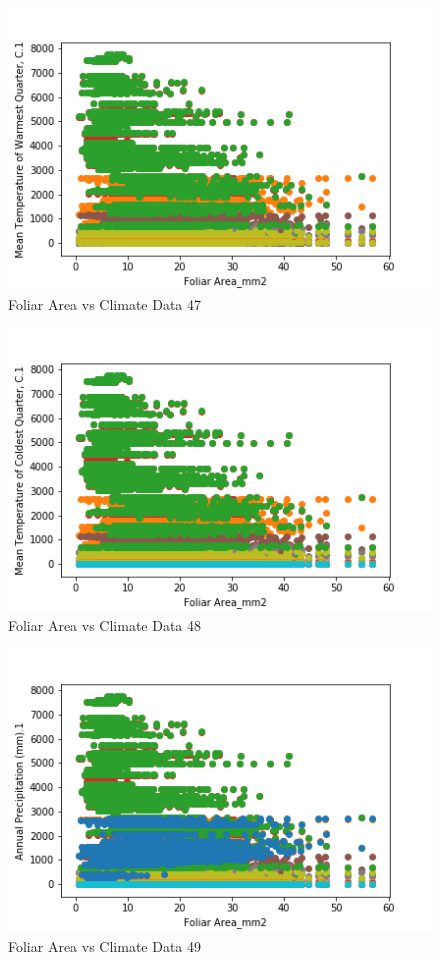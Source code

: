 \documentclass[letterpaper]{article}
\begin{document}
\begin{figure}[h]
\caption{Foliar Area vs Climate Data 47\label{fig:Foliar_Area_vs_47}}
\centering
\includegraphics[width=0.7\paperwidth]{Foliar_Area_vs_47}
\end{figure}


\begin{figure}[h]
\caption{Foliar Area vs Climate Data 48\label{fig:Foliar_Area_vs_48}}
\centering
\includegraphics[width=0.7\paperwidth]{Foliar_Area_vs_48}
\end{figure}


\begin{figure}[h]
\caption{Foliar Area vs Climate Data 49\label{fig:Foliar_Area_vs_49}}
\centering
\includegraphics[width=0.7\paperwidth]{Foliar_Area_vs_49}
\end{figure}
\end{document}
